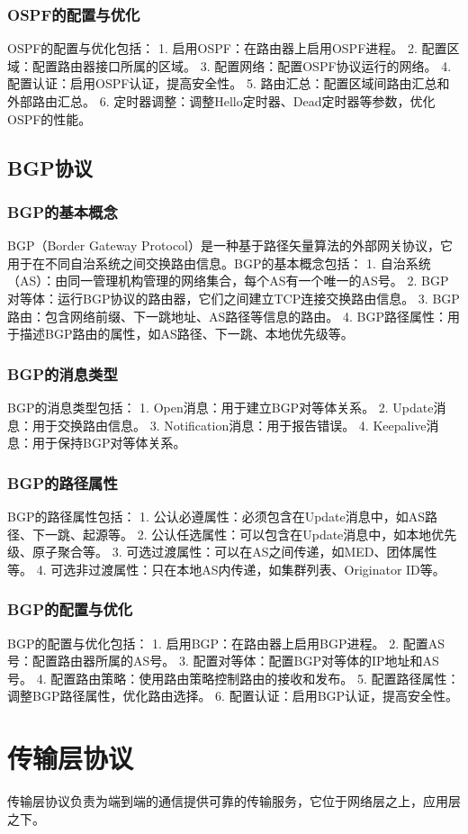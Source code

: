 \documentclass{book}
\begin{document}
\subsubsection{OSPF的配置与优化}
OSPF的配置与优化包括：
1. 启用OSPF：在路由器上启用OSPF进程。
2. 配置区域：配置路由器接口所属的区域。
3. 配置网络：配置OSPF协议运行的网络。
4. 配置认证：启用OSPF认证，提高安全性。
5. 路由汇总：配置区域间路由汇总和外部路由汇总。
6. 定时器调整：调整Hello定时器、Dead定时器等参数，优化OSPF的性能。
\subsection{BGP协议}
\subsubsection{BGP的基本概念}
BGP（Border Gateway Protocol）是一种基于路径矢量算法的外部网关协议，它用于在不同自治系统之间交换路由信息。BGP的基本概念包括：
1. 自治系统（AS）：由同一管理机构管理的网络集合，每个AS有一个唯一的AS号。
2. BGP对等体：运行BGP协议的路由器，它们之间建立TCP连接交换路由信息。
3. BGP路由：包含网络前缀、下一跳地址、AS路径等信息的路由。
4. BGP路径属性：用于描述BGP路由的属性，如AS路径、下一跳、本地优先级等。
\subsubsection{BGP的消息类型}
BGP的消息类型包括：
1. Open消息：用于建立BGP对等体关系。
2. Update消息：用于交换路由信息。
3. Notification消息：用于报告错误。
4. Keepalive消息：用于保持BGP对等体关系。
\subsubsection{BGP的路径属性}
BGP的路径属性包括：
1. 公认必遵属性：必须包含在Update消息中，如AS路径、下一跳、起源等。
2. 公认任选属性：可以包含在Update消息中，如本地优先级、原子聚合等。
3. 可选过渡属性：可以在AS之间传递，如MED、团体属性等。
4. 可选非过渡属性：只在本地AS内传递，如集群列表、Originator ID等。
\subsubsection{BGP的配置与优化}
BGP的配置与优化包括：
1. 启用BGP：在路由器上启用BGP进程。
2. 配置AS号：配置路由器所属的AS号。
3. 配置对等体：配置BGP对等体的IP地址和AS号。
4. 配置路由策略：使用路由策略控制路由的接收和发布。
5. 配置路径属性：调整BGP路径属性，优化路由选择。
6. 配置认证：启用BGP认证，提高安全性。
\section{传输层协议}
传输层协议负责为端到端的通信提供可靠的传输服务，它位于网络层之上，应用层之下。
\end{document}
